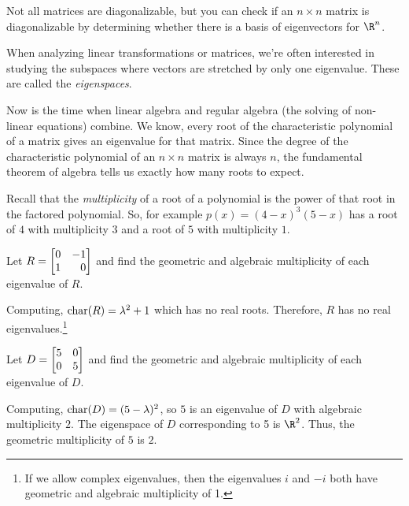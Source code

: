 \begin{emphbox}[Takeaway]
	Not all matrices are diagonalizable, but you can check if an $n\times n$
	matrix is diagonalizable by determining whether there is a basis of eigenvectors for $\R^n$.
\end{emphbox}


When analyzing linear transformations or matrices, we're often interested in
studying the subspaces where vectors are stretched by only one eigenvalue. These 
are called the \emph{eigenspaces}.


Now is the time when linear algebra and regular algebra (the solving of non-linear equations)
combine. We know, every root of the characteristic polynomial of a matrix gives an eigenvalue
for that matrix. Since the degree of the characteristic polynomial of an $n\times n$ matrix
is always $n$, the fundamental theorem of algebra tells us exactly how many roots to expect.

Recall that the \emph{multiplicity} of a root of a polynomial is the power of that root
in the factored polynomial. So, for example $p(x)=(4-x)^3(5-x)$ has a root of $4$ with multiplicity
$3$ and a root of $5$ with multiplicity $1$.

\begin{example}
	Let $R=\mat{0&-1\\1&0}$ and find the geometric and algebraic multiplicity of each eigenvalue of $R$.
	
	Computing, $\operatorname{char}(R)=\lambda^2+1$ which has no real roots. Therefore,
	$R$ has no real eigenvalues.\footnote{ If we allow complex eigenvalues, then the eigenvalues
	$i$ and $-i$ both have geometric and algebraic multiplicity of 1.}
\end{example}

\begin{example}
	Let $D=\mat{5&0\\0&5}$ and find the geometric and algebraic multiplicity of each eigenvalue of $D$.
	
	Computing, $\operatorname{char}(D)=(5-\lambda)^2$, so $5$ is an eigenvalue of $D$ with algebraic multiplicity $2$.
	The eigenspace of $D$ corresponding to 5 is $\R^2$. Thus, the geometric multiplicity of $5$ is $2$.
\end{example}

